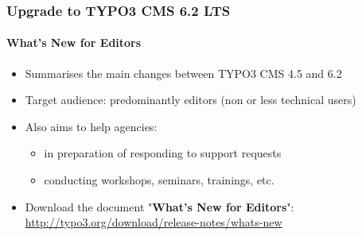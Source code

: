 \begin{frame}[fragile]
	\frametitle{Upgrade to TYPO3 CMS 6.2 LTS}
	\framesubtitle{What's New for Editors}

	\begin{itemize}
		\item Summarises the main changes between TYPO3 CMS 4.5 and 6.2
		\item Target audience: predominantly editors (non or less technical users)
		\item Also aims to help agencies:

			\begin{itemize}
				\item in preparation of responding to support requests
				\item conducting workshops, seminars, trainings, etc.
			\end{itemize}

		\item Download the document "\textbf{What's New for Editors}":\newline
			\smaller\url{http://typo3.org/download/release-notes/whats-new}\normalsize

	\end{itemize}

\end{frame}


